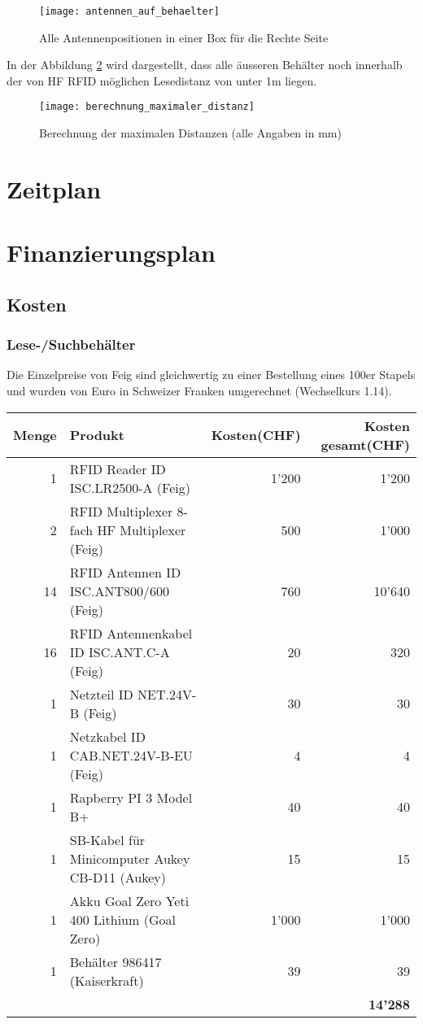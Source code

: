 \begin{figure}
	\centering
	\texttt{[image: antennen\_auf\_behaelter]}
	\caption{Alle Antennenpositionen in einer Box für die Rechte Seite}
	\label{fig:antennenPositionen}
\end{figure}

In der Abbildung \ref{fig:distanzcalc} wird dargestellt, dass alle äusseren Behälter noch innerhalb der von HF RFID möglichen Lesedistanz von unter 1m liegen.

\begin{figure}
	\centering
	\texttt{[image: berechnung\_maximaler\_distanz]}
	\caption{Berechnung der maximalen Distanzen (alle Angaben in mm)}
	\label{fig:distanzcalc}
\end{figure}

\chapter{Zeitplan}

\chapter{Finanzierungsplan}
\section{Kosten}
\subsection{Lese-/Suchbehälter}
Die Einzelpreise von Feig sind gleichwertig zu einer Bestellung eines 100er Stapels und wurden von Euro in Schweizer Franken umgerechnet (Wechselkurs 1.14).

\begin{tabularx}{\textwidth}{|r|X|r|r|}
	\hline 
	\textbf{Menge} & \textbf{Produkt} & \textbf{Kosten(CHF)} & \textbf{Kosten gesamt(CHF)} \\
	\hline 
	1 & RFID Reader ID ISC.LR2500-A (Feig) & 1'200 & 1'200 \\ 
	\hline 
	2 & RFID Multiplexer 8-fach HF Multiplexer (Feig) & 500 & 1'000 \\ 
	\hline 
	14 & RFID Antennen ID ISC.ANT800/600 (Feig)& 760 & 10'640 \\
	\hline
	16 & RFID Antennenkabel ID ISC.ANT.C-A (Feig) & 20 & 320 \\
	\hline
	1 & Netzteil ID NET.24V-B (Feig) & 30 & 30 \\
	\hline
	1 & Netzkabel ID CAB.NET.24V-B-EU (Feig) & 4 & 4 \\
	\hline
	1 & Rapberry PI 3 Model B+ & 40 & 40 \\
	\hline
	1 & SB-Kabel für Minicomputer Aukey CB-D11 (Aukey) & 15 & 15 \\
	\hline
	1 & Akku Goal Zero Yeti 400 Lithium (Goal Zero) & 1'000 & 1'000 \\
	\hline
	1 & Behälter 986417 (Kaiserkraft) & 39 & 39 \\
	\hline
	& & & \textbf{14'288} \\
	\hline
\end{tabularx} 
